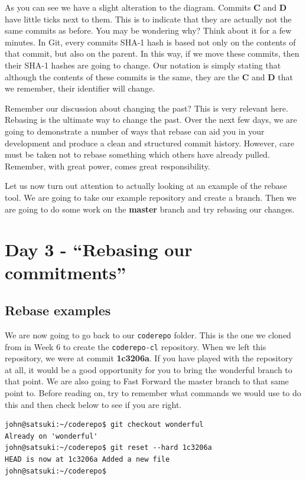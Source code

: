As you can see we have a slight alteration to the diagram.  Commits \textbf{C} and \textbf{D} have little ticks next to them.  This is to indicate that they are actually not the same commits as before.  You may be wondering why?  Think about it for a few minutes.  In Git, every commits SHA-1 hash is based not only on the contents of that commit, but also on the parent.  In this way, if we move these commits, then their SHA-1 hashes are going to change.  Our notation is simply stating that although the contents of these commits is the same, they are the \textbf{C} and \textbf{D} that we remember, their identifier will change.  

Remember our discussion about changing the past?  This is very relevant here.  Rebasing is the ultimate way to change the past.  Over the next few days, we are going to demonstrate a number of ways that rebase can aid you in your development and produce a clean and structured commit history.  However, care must be taken not to rebase something which others have already pulled.  Remember, with great power, comes great responsibility.

Let us now turn out attention to actually looking at an example of the rebase tool.  We are going to take our example repository and create a branch.  Then we are going to do some work on the \textbf{master} branch and try rebasing our changes.

\section{Day 3 - ``Rebasing our commitments''}
\subsection{Rebase examples}

We are now going to go back to our \texttt{coderepo} folder.  This is the one we cloned from in Week 6 to create the \texttt{coderepo-cl} repository.  When we left this repository, we were at commit \textbf{1c3206a}.  If you have played with the repository at all, it would be a good opportunity for you to bring the wonderful branch to that point.  We are also going to Fast Forward the master branch to that same point to.  Before reading on, try to remember what commands we would use to do this and then check below to see if you are right.

\begin{Verbatim}
john@satsuki:~/coderepo$ git checkout wonderful
Already on 'wonderful'
john@satsuki:~/coderepo$ git reset --hard 1c3206a
HEAD is now at 1c3206a Added a new file
john@satsuki:~/coderepo$
\end{Verbatim}

